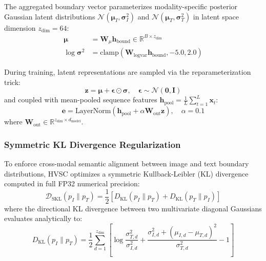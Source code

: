 \documentclass[11pt,journal,onecolumn,draftcls]{IEEEtran}
\begin{document}
The aggregated boundary vector parameterizes modality-specific posterior Gaussian latent distributions $\mathcal{N}(\boldsymbol{\mu}_I, \boldsymbol{\sigma}_I^2)$ and $\mathcal{N}(\boldsymbol{\mu}_T, \boldsymbol{\sigma}_T^2)$ in latent space dimension $z_{\text{dim}} = 64$:
\begin{align}
\boldsymbol{\mu} &= \mathbf{W}_\mu \mathbf{h}_{\text{bound}} \in \mathbb{R}^{B \times z_{\text{dim}}} \\
\log \boldsymbol{\sigma}^2 &= \text{clamp}(\mathbf{W}_{\text{logvar}} \mathbf{h}_{\text{bound}}, -5.0, 2.0)
\end{align}

During training, latent representations are sampled via the reparameterization trick:
\begin{equation}
\mathbf{z} = \boldsymbol{\mu} + \boldsymbol{\epsilon} \odot \boldsymbol{\sigma}, \quad \boldsymbol{\epsilon} \sim \mathcal{N}(\mathbf{0}, \mathbf{I})
\end{equation}
and coupled with mean-pooled sequence features $\mathbf{h}_{\text{pool}} = \frac{1}{L}\sum_{t=1}^L \mathbf{x}_t$:
\begin{equation}
\mathbf{e} = \text{LayerNorm}(\mathbf{h}_{\text{pool}} + \alpha \mathbf{W}_{\text{out}} \mathbf{z}), \quad \alpha = 0.1
\end{equation}
where $\mathbf{W}_{\text{out}} \in \mathbb{R}^{z_{\text{dim}} \times d_{\text{model}}}$.

\subsubsection{Symmetric KL Divergence Regularization}
To enforce cross-modal semantic alignment between image and text boundary distributions, HVSC optimizes a symmetric Kullback-Leibler (KL) divergence computed in full FP32 numerical precision:
\begin{equation}
\mathcal{D}_{\text{SKL}}(p_I \parallel p_T) = \frac{1}{2} \left[ D_{\text{KL}}(p_I \parallel p_T) + D_{\text{KL}}(p_T \parallel p_I) \right]
\end{equation}
where the directional KL divergence between two multivariate diagonal Gaussians evaluates analytically to:
\begin{equation}
D_{\text{KL}}(p_I \parallel p_T) = \frac{1}{2} \sum_{d=1}^{z_{\text{dim}}} \left[ \log \frac{\sigma_{T,d}^2}{\sigma_{I,d}^2} + \frac{\sigma_{I,d}^2 + (\mu_{I,d} - \mu_{T,d})^2}{\sigma_{T,d}^2} - 1 \right]
\end{equation}
\end{document}
